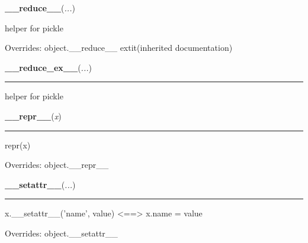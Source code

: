     \vspace{0.5ex}

    \begin{boxedminipage}{\textwidth}

    \raggedright \textbf{\_\_reduce\_\_}(\textit{...})

    helper for pickle

    \vspace{1ex}

      Overrides: object.\_\_reduce\_\_ 	extit{(inherited documentation)}

    \end{boxedminipage}

    \label{object:__reduce_ex__}

    \vspace{0.5ex}

    \begin{boxedminipage}{\textwidth}

    \raggedright \textbf{\_\_reduce\_ex\_\_}(\textit{...})

    \vspace{-1.5ex}

    \rule{\textwidth}{0.5\fboxrule}
    helper for pickle

    \vspace{1ex}

    \end{boxedminipage}

    \vspace{0.5ex}

    \begin{boxedminipage}{\textwidth}

    \raggedright \textbf{\_\_repr\_\_}(\textit{x})

    \vspace{-1.5ex}

    \rule{\textwidth}{0.5\fboxrule}
    repr(x)

    \vspace{1ex}

      Overrides: object.\_\_repr\_\_

    \end{boxedminipage}

    \vspace{0.5ex}

    \begin{boxedminipage}{\textwidth}

    \raggedright \textbf{\_\_setattr\_\_}(\textit{...})

    \vspace{-1.5ex}

    \rule{\textwidth}{0.5\fboxrule}
    x.\_\_setattr\_\_('name', value) {\textless}=={\textgreater} x.name = 
    value

    \vspace{1ex}

      Overrides: object.\_\_setattr\_\_

    \end{boxedminipage}

